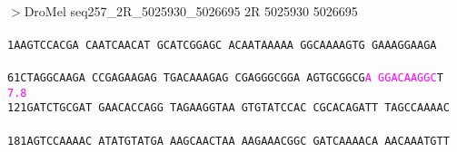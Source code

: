 \documentclass[11pt,twoside,reqno,a4paper]{article}
\begin{document}
\\
$>$DroMel	seq257\_2R\_5025930\_5026695	2R	5025930	5026695 \\
 \\
\texttt{1\hspace*{3\charwidth}AAGTCCACGA	CAATCAACAT	GCATCGGAGC	ACAATAAAAA	GGCAAAAGTG	GAAAGGAAGA	\\
\hspace*{4\charwidth}\hspace*{1\charwidth}\hspace*{1\charwidth}\hspace*{1\charwidth}\hspace*{1\charwidth}\hspace*{1\charwidth}\hspace*{1\charwidth}\\
61\hspace*{2\charwidth}CTAGGCAAGA	CCGAGAAGAG	TGACAAAGAG	CGAGGGCGGA	AGTGCGGCG\textcolor{magenta}{A}	\textcolor{magenta}{G}\textcolor{magenta}{G}\textcolor{magenta}{A}\textcolor{magenta}{C}\textcolor{magenta}{A}\textcolor{magenta}{A}\textcolor{magenta}{G}\textcolor{magenta}{G}\textcolor{magenta}{C}T	\\
\hspace*{4\charwidth}\hspace*{1\charwidth}\hspace*{1\charwidth}\hspace*{1\charwidth}\hspace*{1\charwidth}\hspace*{49\charwidth}\textcolor{magenta}{7.8}\hspace*{1\charwidth}\hspace*{1\charwidth}\\
121\hspace*{1\charwidth}GATCTGCGAT	GAACACCAGG	TAGAAGGTAA	GTGTATCCAC	CGCACAGATT	TAGCCAAAAC	\\
\hspace*{4\charwidth}\hspace*{1\charwidth}\hspace*{1\charwidth}\hspace*{1\charwidth}\hspace*{1\charwidth}\hspace*{1\charwidth}\hspace*{1\charwidth}\\
181\hspace*{1\charwidth}AGTCCAAAAC	ATATGTATGA	AAGCAACTAA	AAGAAACGGC	GATCAAAACA	AACAAATGTT	\\
\hspace*{4\charwidth}\hspace*{1\charwidth}\hspace*{1\charwidth}\hspace*{1\charwidth}\hspace*{1\charwidth}\hspace*{1\charwidth}\hspace*{1\charwidth}\\
}
\end{document}
